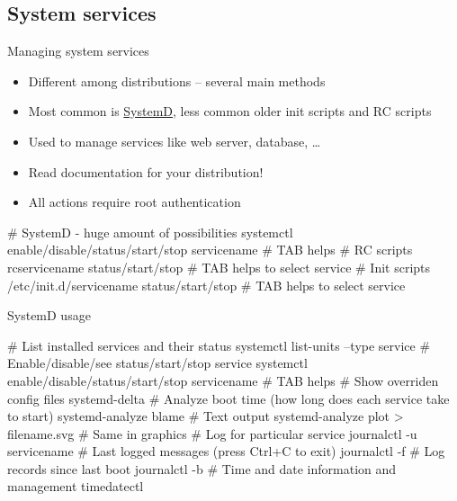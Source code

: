 \documentclass[compress, ucs, xelatex, 11pt, xcolor=svgnames,
  hyperref={
    bookmarks=true,
    unicode=true,
    colorlinks=true,
    pdftitle={Linux, command line and MetaCentrum},
    plainpages=false,
    pdfauthor={Vojtech Zeisek},
    pdfsubject={Course about use of Linux command line, writing shell scripts and using MetaCentrum of CESNET},
    pdfcreator={XeLaTeX},
    pdfkeywords={Linux, GNU, BASH, shell, command line, MetaCentrum},
    linkcolor=Red,
    anchorcolor=Blue,
    citecolor=Purple,
    filecolor=DodgerBlue,
    menucolor=DarkOrchid,
    urlcolor=DeepSkyBlue,
    pdftex},
  url={hyphens, lowtilde} %
  ]{beamer}
\begin{document}
\subsection{System services}

\begin{frame}[fragile]{Managing system services}
\begin{itemize}
  \item Different among distributions -- several main methods
  \item Most common is \href{https://wiki.freedesktop.org/www/Software/systemd/}{SystemD}, less common older init scripts and RC scripts
  \item Used to manage services like web server, database, \ldots
  \item \alert{Read documentation for your distribution!}
  \item All actions require root authentication
\end{itemize}
  \begin{bashcode}
    # SystemD - huge amount of possibilities
    systemctl enable/disable/status/start/stop servicename # TAB helps
    # RC scripts
    rcservicename status/start/stop # TAB helps to select service
    # Init scripts
    /etc/init.d/servicename status/start/stop # TAB helps to select service
  \end{bashcode}
\end{frame}

\begin{frame}[fragile]{SystemD usage}
  \begin{bashcode}
    # List installed services and their status
    systemctl list-units --type service
    # Enable/disable/see status/start/stop service
    systemctl enable/disable/status/start/stop servicename # TAB helps
    # Show overriden config files
    systemd-delta
    # Analyze boot time (how long does each service take to start)
    systemd-analyze blame # Text output
    systemd-analyze plot > filename.svg # Same in graphics
    # Log for particular service
    journalctl -u servicename
    # Last logged messages (press Ctrl+C to exit)
    journalctl -f
    # Log records since last boot
    journalctl -b
    # Time and date information and management
    timedatectl
  \end{bashcode}
\end{frame}

\end{document}
